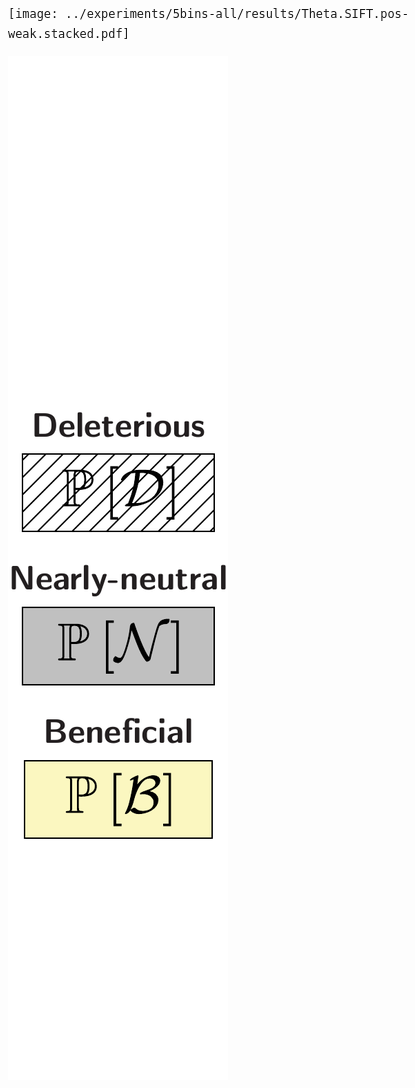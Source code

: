 \documentclass{article}
\begin{document}
\begin{center}
\begin{minipage}{0.09\linewidth}
        \end{minipage}
        \begin{minipage}{0.9\linewidth}
            \texttt{[image: ../experiments/5bins-all/results/Theta.SIFT.pos-weak.stacked.pdf]} \\
        \end{minipage}
        \begin{minipage}{0.09\linewidth}
            \includegraphics[width=\linewidth, page=1]{artworks/legend.polycat}

\end{minipage}
\end{center}
\end{document}
